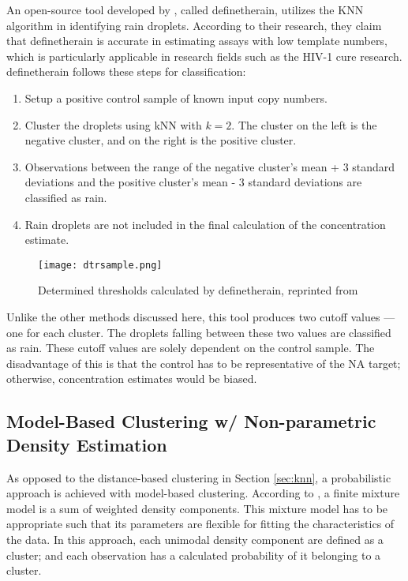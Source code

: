 An open-source tool developed by , called definetherain, utilizes the KNN algorithm in identifying rain droplets. According to their research, they claim that definetherain is accurate in estimating assays with low template numbers, which is particularly applicable in research fields such as the HIV-1 cure research. definetherain follows these steps for classification:
\begin{enumerate}
    \item Setup a positive control sample of known input copy numbers. 
    \item Cluster the droplets using kNN with \(k=2\). The cluster on the left is the negative cluster, and on the right is the positive cluster. 
    \item Observations between the range of the negative cluster's mean + 3 standard deviations and the positive cluster's mean - 3 standard deviations are classified as rain.
    \item Rain droplets are not included in the final calculation of the concentration estimate.
\end{enumerate}

\begin{figure}[h]
    \centering
    \texttt{[image: dtrsample.png]}
    \caption[Determined thresholds calculated by definetherain]{Determined thresholds calculated by definetherain, reprinted from \cite{jonesThreshold}}
        \label{fig:dtrsample}
\end{figure}

Unlike the other methods discussed here, this tool produces two cutoff values — one for each cluster. The droplets falling between these two values are classified as rain. These cutoff values are solely dependent on the control sample. The disadvantage of this is that the control has to be representative of the NA target; otherwise, concentration estimates would be biased. 



\subsection{Model-Based Clustering w/ Non-parametric Density Estimation}
\label{sec:nonparamdensityest}

As opposed to the distance-based clustering in Section \ref{sec:knn}, a probabilistic approach is achieved with model-based clustering. According to , a finite mixture model is a sum of weighted density components. This mixture model has to be appropriate such that its parameters are flexible for fitting the characteristics of the data. In this approach, each unimodal density component are defined as a cluster; and each observation has a calculated probability of it belonging to a cluster. 

